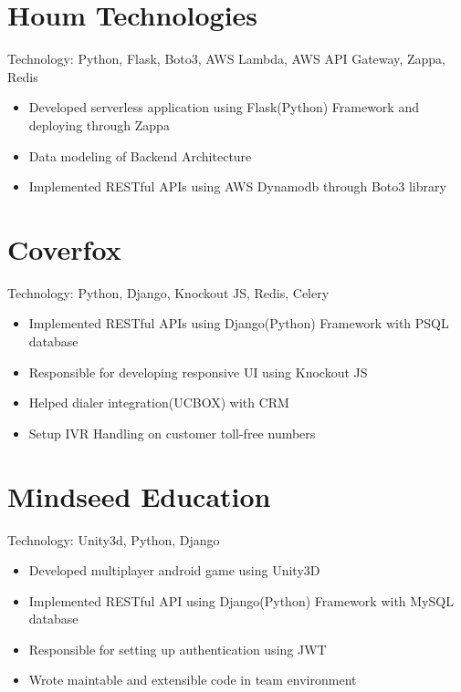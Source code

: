 \documentclass[11pt,a4paper,sans]{moderncv} %
\begin{document}
\section{Houm Technologies}

{Technology: Python, Flask, Boto3, AWS Lambda, AWS API Gateway, Zappa, Redis}{}{}
{\begin{itemize}
		\item Developed serverless application using Flask(Python) Framework and deploying through Zappa
		\item Data modeling of Backend Architecture
		\item Implemented RESTful APIs using AWS Dynamodb through Boto3 library
\end{itemize}}

\section{Coverfox}

{Technology: Python, Django, Knockout JS, Redis, Celery}{}{}
{\begin{itemize}
\item Implemented RESTful APIs using Django(Python) Framework with PSQL database
\item Responsible for developing responsive UI using Knockout JS
\item Helped dialer integration(UCBOX) with CRM
\item Setup IVR Handling on customer toll-free numbers 
\end{itemize}}


\section{Mindseed Education}

{Technology: Unity3d, Python, Django}{}{}
{\begin{itemize}
\item Developed multiplayer android game using Unity3D
\item Implemented RESTful API using Django(Python) Framework with MySQL database
\item Responsible for setting up authentication using JWT
\item Wrote maintable and extensible code in team environment
\end{itemize}}
\end{document}
